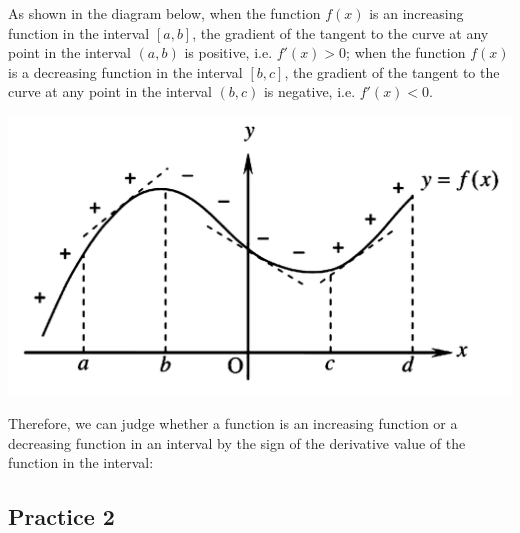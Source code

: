 \documentclass{report}
\begin{document}
As shown in the diagram below, when the function $f(x)$ is an increasing
function in the interval $[a, b]$, the gradient of the tangent to the curve at
any point in the interval $(a, b)$ is positive, i.e. $f'(x) > 0$; when the
function $f(x)$ is a decreasing function in the interval $[b, c]$, the gradient
of the tangent to the curve at any point in the interval $(b, c)$ is negative,
i.e. $f'(x) < 0$.
\begin{center}
    \includegraphics[scale=0.25]{assets/26-5.png}
\end{center}
Therefore, we can judge whether a function is an increasing function or a decreasing function in an interval by the sign of the derivative value of the function in the interval:
\begin{center}
\end{center}
\vspace{0.9em}

\subsection{Practice 2}
\end{document}
